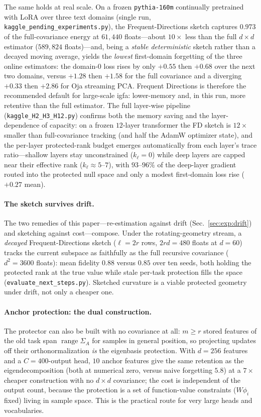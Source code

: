 \documentclass[10pt,a4paper]{article}
\theoremstyle{plain}
\theoremstyle{definition}
\newcommand{\Sig}{\Sigma}
\DeclareMathOperator{\range}{range}
\newcommand{\IGFA}{igfa}
\begin{document}
The same holds at real scale. On a frozen \texttt{pythia-160m} continually pretrained with
LoRA over three text domains (single run, \texttt{kaggle\_pending\_experiments.py}), the
Frequent-Directions sketch captures $0.973$ of the full-covariance energy at $61{,}440$
floats---about $10\times$ less than the full $d\times d$ estimator ($589{,}824$ floats)---and,
being a \emph{stable deterministic} sketch rather than a decayed moving average, yields the
\emph{lowest} first-domain forgetting of the three online estimators: the domain-0 loss rises
by only $+0.55$ then $+0.68$ over the next two domains, versus $+1.28$ then $+1.58$ for the
full covariance and a diverging $+0.33$ then $+2.86$ for Oja streaming PCA. Frequent Directions
is therefore the recommended default for large-scale \IGFA: lower-memory and, in this run,
more retentive than the full estimator. The full layer-wise pipeline
(\texttt{kaggle\_H2\_H3\_H12.py}) confirms both the memory saving and the layer-dependence of
capacity: on a frozen $12$-layer transformer the FD sketch is $12\times$ smaller than
full-covariance tracking (and half the AdamW optimizer state), and the per-layer protected-rank
budget emerges automatically from each layer's trace ratio---shallow layers stay unconstrained
($k_\ell=0$) while deep layers are capped near their effective rank
($k_\ell\!\approx\!5$--$7$), with $93$--$96\%$ of the deep-layer gradient routed into the
protected null space and only a modest first-domain loss rise ($+0.27$ mean).

\paragraph{The sketch survives drift.} The two remedies of this paper---re-estimation
against drift (Sec.~\ref{sec:exp:drift}) and sketching against cost---compose. Under the
rotating-geometry stream, a \emph{decayed} Frequent-Directions sketch ($\ell=2r$ rows,
$2rd=480$ floats at $d=60$) tracks the current subspace as faithfully as the full recursive
covariance ($d^2=3600$ floats): mean fidelity $0.88$ versus $0.85$ over ten seeds, both
holding the protected rank at the true value while stale per-task protection fills the
space (\texttt{evaluate\_next\_steps.py}). Sketched curvature is a viable protected
geometry under drift, not only a cheaper one.

\paragraph{Anchor protection: the dual construction.} The protector can also be built with
no covariance at all: $m\ge r$ stored features of the old task span $\range\Sig_A$ for
samples in general position, so projecting updates off their orthonormalization \emph{is}
the eigenbasis protection. With $d=256$ features and a $C=400$-output head, $10$ anchor
features give the same retention as the eigendecomposition (both at numerical zero, versus
naive forgetting $5.8$) at a $7\times$ cheaper construction with no $d\times d$ covariance;
the cost is independent of the output count, because the protection is a set of
function-value constraints ($W\phi_i$ fixed) living in sample space. This is the practical
route for very large heads and vocabularies.
\end{document}
